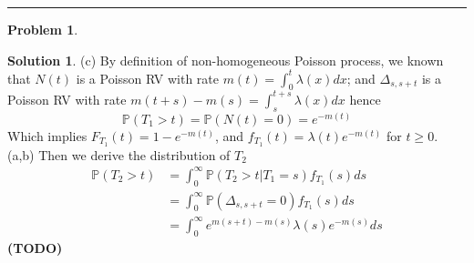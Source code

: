 \documentclass[a4paper, 10pt]{article}
\theoremstyle{definition}
\newtheorem{problem}{Problem}
\theoremstyle{hSol}
\newtheorem*{solution}{Solution}
\begin{document}
\noindent\rule{16cm}{0.4pt}
\begin{problem} 
\end{problem}
\begin{solution} (c) By definition of non-homogeneous Poisson process, we known that $N(t)$ is a Poisson RV with rate $m(t)=\int_0^t \lambda(x)dx$; and $\Delta_{s,s+t}$ is a Poisson RV with rate $m(t+s)-m(s)=\int_s^{t+s} \lambda(x)dx$ hence
\begin{equation}
    \mathbb{P}\left(T_1>t\right) = \mathbb{P}\left(N(t)=0\right) = e^{-m(t)}
\end{equation}
Which implies $F_{T_1}(t)=1-e^{-m(t)}$, and $f_{T_1}(t)=\lambda(t)e^{-m(t)}$ for $t\geq 0$. \\
(a,b) Then we derive the distribution of $T_2$ 
\begin{equation}
  \begin{split}
    \mathbb{P}\left(T_2>t\right) &= \int_0^{\infty} \mathbb{P}\left(T_2>t|T_1=s\right) f_{T_1}(s) ds\\
    &= \int_0^{\infty} \mathbb{P}\left(\Delta_{s,s+t}=0\right) f_{T_1}(s) ds\\
    &= \int_0^{\infty} e^{m(s+t)-m(s)} \lambda(s) e^{-m(s)}ds
  \end{split}
\end{equation}
\textbf{(TODO)}
\end{solution}
\end{document}
